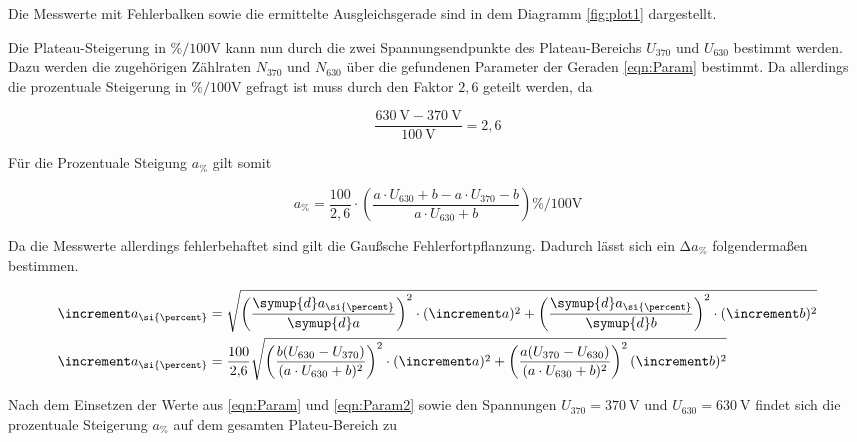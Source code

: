 \begin{flushleft}
Die Messwerte mit Fehlerbalken sowie die ermittelte Ausgleichsgerade sind in dem Diagramm
\ref{fig:plot1} dargestellt.

Die Plateau-Steigerung in $\si{\percent\per{100}\volt}$ kann nun durch die zwei Spannungsendpunkte des Plateau-Bereichs $U_{370}$ und $U_{630}$
bestimmt werden. Dazu werden die zugehörigen Zählraten $N_{370}$ und $N_{630}$ über die gefundenen Parameter der
Geraden \eqref{eqn:Param} bestimmt. Da allerdings die prozentuale Steigerung in $\si{\percent\per{100}\volt}$ gefragt ist muss durch den Faktor $2{,}6$ geteilt
werden, da

\begin{equation*}
\frac{\SI{630}{\volt} - \SI{370}{\volt}}{\SI{100}{\volt}} = 2{,}6
\end{equation*}

Für die Prozentuale Steigung $a_{\si{\percent}}$ gilt somit

\begin{equation}
a_{\si{\percent}} = \frac{100}{2{,}6} \cdot\left( \frac{a \cdot U_{630} + b - a \cdot U_{370} - b}{a \cdot U_{630} + b} \right) \si{\percent\per{100}\volt}
\end{equation}

Da die Messwerte allerdings fehlerbehaftet sind gilt die Gaußsche Fehlerfortpflanzung. Dadurch lässt sich
ein $\increment a_{\si{\percent}}$ folgendermaßen bestimmen.

\begin{align}
\increment a_{\si{\percent}} &= \sqrt{\left(\frac{\symup{d}a_{\si{\percent}}}{\symup{d}a}\right)^{2} \cdot 
(\increment a)^{2} + \left(\frac{\symup{d}a_{\si{\percent}}}{\symup{d}b}\right)^{2} \cdot
(\increment b)^{2}} \\
\increment a_{\si{\percent}} &= \frac{100}{2{,}6}\sqrt{\left(\frac{b(U_{630}-U_{370})}{(a \cdot U_{630} + b)^{2}}\right)^{2} \cdot 
(\increment a)^{2} + 
\left(\frac{a(U_{370}-U_{630})}{(a \cdot U_{630} + b)^{2}}\right)^{2}
(\increment b)^{2}}
\end{align}

Nach dem Einsetzen der Werte aus \eqref{eqn:Param} und \eqref{eqn:Param2} sowie den Spannungen $U_{370} = \SI{370}{\volt}$ und $U_{630} = \SI{630}{\volt}$ 
findet sich die prozentuale Steigerung $a_{\si{\percent}}$ auf dem gesamten Plateu-Bereich zu



\end{flushleft}
